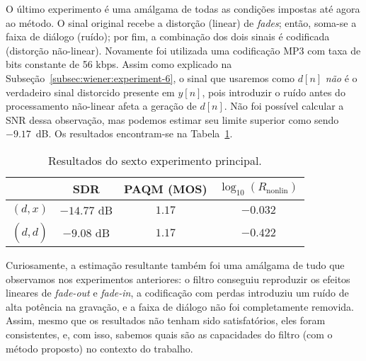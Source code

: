 O último experimento é uma amálgama de todas as condições impostas até agora ao método. O sinal original recebe a distorção (linear) de \textit{fades}; então, soma-se a faixa de diálogo (ruído); por fim, a combinação dos dois sinais é codificada (distorção não-linear). Novamente foi utilizada uma codificação MP3 com taxa de bits constante de 56 kbps. Assim como explicado na Subseção~\ref{subsec:wiener:experiment-6}, o sinal que usaremos como $d[n]$ \emph{não} é o verdadeiro sinal distorcido presente em $y[n]$, pois introduzir o ruído antes do processamento não-linear afeta a geração de $d[n]$. Não foi possível calcular a SNR dessa observação, mas podemos estimar seu limite superior como sendo $-9.17$~dB. Os resultados encontram-se na Tabela~\ref{tab:correntropy:experiment-6}.
{\def\arraystretch{1.25}\tabcolsep=10pt
\begin{table}[!ht]
    \centering
    \caption[Resultados do sexto experimento: \textit{fades} com ruído aditivo e codificação com perdas]{Resultados do sexto experimento principal.}
    \label{tab:correntropy:experiment-6}
    \begin{tabular}{cccc}
        \toprule
                         & SDR        & PAQM (MOS)   & $\log_{10}(R_{\text{nonlin}})$ \\
        \midrule
        $(d, x)$       & $-14.77$ dB & $1.17$  &  $-0.032$               \\
        $(d, \hat{d})$ & $-9.08$ dB & $1.17$  &   $-0.422$              \\ \bottomrule
    \end{tabular}
\end{table}
}

Curiosamente, a estimação resultante também foi uma amálgama de tudo que observamos nos experimentos anteriores: o filtro conseguiu reproduzir os efeitos lineares de \textit{fade-out} e \textit{fade-in}, a codificação com perdas introduziu um ruído de alta potência na gravação, e a faixa de diálogo não foi completamente removida. Assim, mesmo que os resultados não tenham sido satisfatórios, eles foram consistentes, e, com isso, sabemos quais são as capacidades do filtro (com o método proposto) no contexto do trabalho.